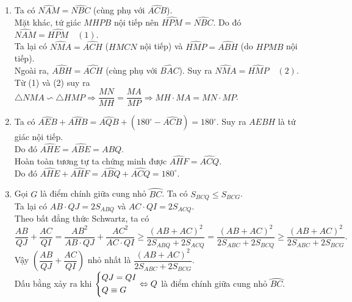 \begin{ex}
{\begin{center}
		\end{center}
		\begin{enumerate}
			\item Ta có $\widehat{NAM} = \widehat{NBC}$ (cùng phụ với $\widehat{ACB}$).\\
			Mặt khác, tứ giác $MHPB$ nội tiếp nên $\widehat{HPM} = \widehat{NBC}$. Do đó $\widehat{NAM} = \widehat{HPM}\quad(1)$.\\
			Ta lại có $\widehat{NMA} = \widehat{ACH}$ ($HMCN$ nội tiếp) và $\widehat{HMP} = \widehat{ABH}$ (do $HPMB$ nội tiếp).\\
			Ngoài ra, $\widehat{ABH} = \widehat{ACH}$ (cùng phụ với $\widehat{BAC}$). Suy ra $\widehat{NMA} = \widehat{HMP}\quad(2)$.\\
			Từ (1) và (2) suy ra $\triangle NMA \backsim \triangle HMP \Rightarrow \dfrac{MN}{MH} = \dfrac{MA}{MP} \Rightarrow MH \cdot MA=MN \cdot MP$.
			\item Ta có $\widehat{AEB}+\widehat{AHB}=\widehat{AQB} + (180^\circ - \widehat{ACB})=180^\circ$. Suy ra $AEBH$ là tứ giác nội tiếp.\\
			Do đó $\widehat{AHE} = \widehat{ABE} = \widehat{ABQ}$.\\
			Hoàn toàn tương tự ta chứng minh được $\widehat{AHF} = \widehat{ACQ}$.\\
			Do đó $\widehat{AHE}+\widehat{AHF} = \widehat{ABQ} + \widehat{ACQ} = 180^\circ$.
			\item Gọi $G$ là điểm chính giữa cung nhỏ $\wideparen{BC}$. Ta có $S_{BCQ}\leq S_{BCG}$.\\
			Ta lại có $AB \cdot QJ = 2 S_{ABQ}$ và $AC \cdot QI = 2 S_{ACQ}$.\\
			Theo bất đẳng thức Schwartz, ta có $$\dfrac{AB}{QJ}+\dfrac{AC}{QI} = \dfrac{AB^2}{AB \cdot QJ}+\dfrac{AC^2}{AC \cdot QI} \geq \dfrac{(AB+AC)^2}{2S_{ABQ}+2S_{ACQ}} = \dfrac{(AB+AC)^2}{2S_{ABC}+2S_{BCQ}} \geq \dfrac{(AB+AC)^2}{2S_{ABC}+2S_{BCG}}.$$
			Vậy $\left(\dfrac{AB}{QJ}+\dfrac{AC}{QI}\right)$ nhỏ nhất là $\dfrac{(AB+AC)^2}{2S_{ABC}+2S_{BCG}}$.\\
			Dấu bằng xảy ra khi $\left\{\begin{aligned}&QJ = QI\\ &Q \equiv G\end{aligned}\right. \Leftrightarrow Q$ là điểm chính giữa cung nhỏ $\wideparen{BC}$.
		\end{enumerate}
	}
\end{ex}

